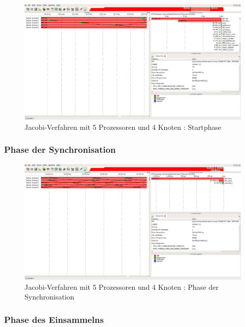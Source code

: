 \documentclass[11pt,a4paper]{article}
\begin{document}
\begin{figure}[htbp] %
   \centering
   \includegraphics[width=1\textwidth]{Jacobi_1_4nodes.png} 
   \caption{Jacobi-Verfahren mit 5 Prozessoren und 4 Knoten : Startphase}
   \label{Jacobi_1_4nodes}
\end{figure}

\subsubsection{Phase der Synchronisation}

\begin{figure}[htbp] %
   \centering
   \includegraphics[width=1\textwidth]{Jacobi_2_4nodes.png} 
   \caption{Jacobi-Verfahren mit 5 Prozessoren und 4 Knoten : Phase der Synchronisation}
   \label{Jacobi_2_4nodes}
\end{figure}

\subsubsection{Phase des Einsammelns}
\end{document}
